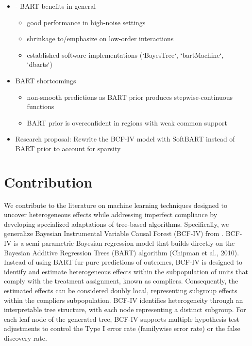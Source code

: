 \begin{itemize}
    \item - BART benefits in general %
    \begin{itemize}
        \item good performance in high-noise settings 
        \item shrinkage to/emphasize on low-order interactions
        \item established software implementations (`BayesTree`, `bartMachine`, `dbarts`)
    \end{itemize}  
    \item BART shortcomings %
    \begin{itemize}
        \item non-smooth predictions as BART prior produces stepwise-continuous functions
        \item BART prior is overconfident in regions with weak common support
    \end{itemize}
    \item Research proposal: Rewrite the BCF-IV model with SoftBART instead of BART prior to account for sparsity
\end{itemize}



\section{Contribution}

We contribute to the literature on machine learning techniques designed to uncover heterogeneous effects while addressing imperfect compliance by developing specialized adaptations of tree-based algorithms.
Specifically, we generalize Bayesian Instrumental Variable Causal Forest (BCF-IV) from \citep{bargagli-stoffi_heterogeneous_2022}. 
BCF-IV is a semi-parametric Bayesian regression model that builds directly on the Bayesian Additive Regression Trees (BART) algorithm (Chipman et al., 2010).
Instead of using BART fur pure predictions of outcomes, BCF-IV is designed to identify and estimate heterogeneous effects within the subpopulation of units that comply with the treatment assignment, known as compliers. 
Consequently, the estimated effects can be considered doubly local, representing subgroup effects within the compliers subpopulation.
BCF-IV identifies heterogeneity through an interpretable tree structure, with each node representing a distinct subgroup.
For each leaf node of the generated tree, BCF-IV supports multiple hypothesis test adjustments to control the Type I error rate (familywise error rate) or the false discovery rate. 

